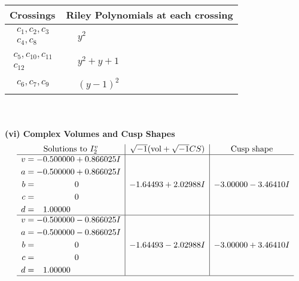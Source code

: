 \documentclass[1p]{elsarticle_modified}
\theoremstyle{definition}
\newcommand{\I}{\sqrt{-1}}
\begin{document}
\begin{tabular}{m{50pt}|m{274pt}}
Crossings & \hspace{64pt}Riley Polynomials at each crossing \\
\hline $$\begin{aligned}c_{1},c_{2},c_{3}\\c_{4},c_{8}\end{aligned}$$&$\begin{aligned}
&y^2
\end{aligned}$\\
\hline $$\begin{aligned}c_{5},c_{10},c_{11}\\c_{12}\end{aligned}$$&$\begin{aligned}
&y^2+y+1
\end{aligned}$\\
\hline $$\begin{aligned}c_{6},c_{7},c_{9}\end{aligned}$$&$\begin{aligned}
&(y-1)^2
\end{aligned}$\\
\hline
\end{tabular}\\~\\
\newpage\flushleft \textbf{(vi) Complex Volumes and Cusp Shapes}
$$\begin{array}{c|c|c}  
\text{Solutions to }I^v_{2}& \I (\text{vol} + \sqrt{-1}CS) & \text{Cusp shape}\\
 \hline 
\begin{aligned}
v &= -0.500000 + 0.866025 I \\
a &= -0.500000 + 0.866025 I \\
b &= \phantom{-0.000000 } 0 \\
c &= \phantom{-0.000000 } 0 \\
d &= \phantom{-}1.00000\phantom{ +0.000000I}\end{aligned}
 & -1.64493 + 2.02988 I & -3.00000 - 3.46410 I \\ \hline\begin{aligned}
v &= -0.500000 - 0.866025 I \\
a &= -0.500000 - 0.866025 I \\
b &= \phantom{-0.000000 } 0 \\
c &= \phantom{-0.000000 } 0 \\
d &= \phantom{-}1.00000\phantom{ +0.000000I}\end{aligned}
 & -1.64493 - 2.02988 I & -3.00000 + 3.46410 I\\
 \hline 
 \end{array}$$\newpage\newpage\renewcommand{\arraystretch}{1}
\end{document}
